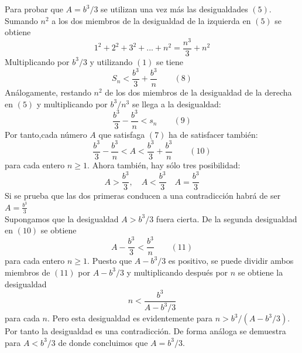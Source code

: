 Para probar que $A=b^3/3$ se utilizan una vez más las desigualdades $(5)$. Sumando $n^2$ a los dos miembros de la desigualdad de la izquierda en $(5)$ se obtiene $$1^2+2^2+3^2+...+n^2=\dfrac{n^3}{3}+n^2$$
Multiplicando por $b^3/3$ y utilizando $(1)$ se tiene $$S_n<\dfrac{b^3}{3}+\dfrac{b^3}{n} \qquad (8)$$
Análogamente, restando $n^2$ de los dos miembros de la desigualdad de la derecha en $(5)$ y multiplicando por $b^3/n^3$ se llega a la desigualdad:
$$\dfrac{b^3}{3}-\dfrac{b^3}{n}<s_n \qquad (9)$$
Por tanto,cada número $A$ que satisfaga $(7)$ ha de satisfacer también: $$\dfrac{b^3}{3}-\dfrac{b^3}{n}<A<\dfrac{b^3}{3}+\dfrac{b^3}{n} \qquad (10)$$ para cada entero $n\geq 1$. Ahora también, hay sólo tres posibilidad: $$A>\dfrac{b^3}{3}, \quad A<\dfrac{b^3}{3} \quad A=\dfrac{b^3}{3}$$
 Si se prueba que las dos primeras conducen a una contradicción habrá de ser $A=\frac{b^3}{3}$\\
 Supongamos que la desigualdad $A>b^3/3$ fuera cierta. De la segunda desigualdad en $(10)$ se obtiene $$A-\dfrac{b^3}{3}<\dfrac{b^3}{n} \qquad (11)$$ para cada entero $n\geq 1$. Puesto que $A-b^3/3$ es positivo, se puede dividir ambos miembros de $(11)$ por $A-b^3/3$ y multiplicando después por $n$ se obtiene la desigualdad $$n<\dfrac{b^3}{A-b^3/3}$$ para cada $n$. Pero esta desigualdad es evidentemente para $n>b^3/(A-b^3/3).$ Por tanto la desigualdad es una contradicción. De forma análoga se demuestra para $A<b^3/3$ de donde concluimos que $A=b^3/3$.\\

\setcounter{chapter}{3}
\setcounter{section}{1}
